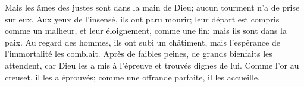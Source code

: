 Mais les âmes des justes sont dans la main de Dieu;
	aucun tourment n’a de prise sur eux.
Aux yeux de l’insensé, ils ont paru mourir;
	leur départ est compris comme un malheur, et leur éloignement, comme une fin:
	mais ils sont dans la paix.
Au regard des hommes, ils ont subi un châtiment,
	mais l’espérance de l’immortalité les comblait.
Après de faibles peines, de grands bienfaits les attendent,
	car Dieu les a mis à l’épreuve et trouvés dignes de lui.
Comme l’or au creuset, il les a éprouvés;
	comme une offrande parfaite, il les accueille.
